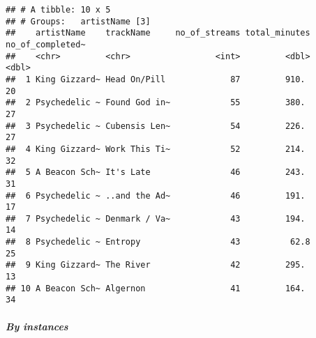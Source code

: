 \documentclass[]{article}
\newenvironment{Shaded}{\begin{snugshade}}{\end{snugshade}}
\newcommand{\DataTypeTok}[1]{\textcolor[rgb]{0.13,0.29,0.53}{#1}}
\newcommand{\DecValTok}[1]{\textcolor[rgb]{0.00,0.00,0.81}{#1}}
\newcommand{\KeywordTok}[1]{\textcolor[rgb]{0.13,0.29,0.53}{\textbf{#1}}}
\newcommand{\NormalTok}[1]{#1}
\newcommand{\OperatorTok}[1]{\textcolor[rgb]{0.81,0.36,0.00}{\textbf{#1}}}
\newcommand{\StringTok}[1]{\textcolor[rgb]{0.31,0.60,0.02}{#1}}
\let\oldsubparagraph\subparagraph
\renewcommand{\subparagraph}[1]{\oldsubparagraph{#1}\mbox{}}
\begin{document}
\begin{Shaded}
\end{Shaded}

\begin{verbatim}
## # A tibble: 10 x 5
## # Groups:   artistName [3]
##    artistName    trackName     no_of_streams total_minutes no_of_completed~
##    <chr>         <chr>                 <int>         <dbl>            <dbl>
##  1 King Gizzard~ Head On/Pill             87         910.                20
##  2 Psychedelic ~ Found God in~            55         380.                27
##  3 Psychedelic ~ Cubensis Len~            54         226.                27
##  4 King Gizzard~ Work This Ti~            52         214.                32
##  5 A Beacon Sch~ It's Late                46         243.                31
##  6 Psychedelic ~ ..and the Ad~            46         191.                17
##  7 Psychedelic ~ Denmark / Va~            43         194.                14
##  8 Psychedelic ~ Entropy                  43          62.8               25
##  9 King Gizzard~ The River                42         295.                13
## 10 A Beacon Sch~ Algernon                 41         164.                34
\end{verbatim}

\hypertarget{by-instances}{%
\subparagraph{By instances}\label{by-instances}}

\begin{Shaded}
\end{Shaded}
\end{document}
